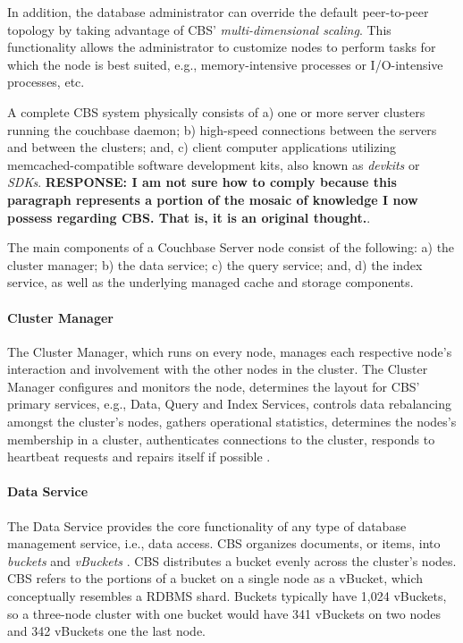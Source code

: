 \documentclass[9pt,twocolumn,twoside]{../../styles/osajnl}
\begin{document}
In addition, the database administrator can override the default peer-to-peer topology by taking advantage of CBS' \textit{multi-dimensional scaling}.  This functionality allows the administrator to customize nodes to perform tasks for which the node is best suited, e.g., memory-intensive processes or I/O-intensive processes, etc.

A complete CBS system physically consists of a) one or more server clusters running the couchbase daemon; b) high-speed connections between the servers and between the clusters; and, c) client computer applications utilizing memcached-compatible software development kits, also known as \textit{devkits} or \textit{SDKs}.
\textbf{RESPONSE: I am not sure how to comply because this paragraph represents a portion of the mosaic of knowledge I now possess regarding CBS.  That is, it is an original thought.}.  

The main components of a Couchbase Server node consist of the following: a) the cluster manager; b) the data service; c) the query service; and, d) the index service, as well as the underlying managed cache and storage components.
\cite{www-components-cbsinc}

\paragraph{Cluster Manager} The Cluster Manager, which runs on every node, manages each respective node's interaction and involvement with the other nodes in the cluster.  The Cluster Manager configures and monitors the node, determines the layout for CBS' primary services, e.g., Data, Query and Index Services, controls data rebalancing amongst the cluster's nodes, gathers operational statistics, determines the nodes's membership in a cluster, authenticates connections to the cluster, responds to heartbeat requests and repairs itself if possible \cite{www-clustermanager-cbsinc,www-components-cbsinc}.

\paragraph{Data Service} The Data Service provides the core functionality of any type of database management service, i.e., data access.  CBS organizes documents, or items, into \textit{buckets} and \textit{vBuckets} \cite{www-architecture-cbsinc}.  CBS distributes a bucket evenly across the cluster's nodes.  CBS refers to the portions of a bucket on a single node as a vBucket, which conceptually resembles a RDBMS shard.  Buckets typically have 1,024 vBuckets, so a three-node cluster with one bucket would have 341 vBuckets on two nodes and 342 vBuckets one the last node.  
\end{document}

